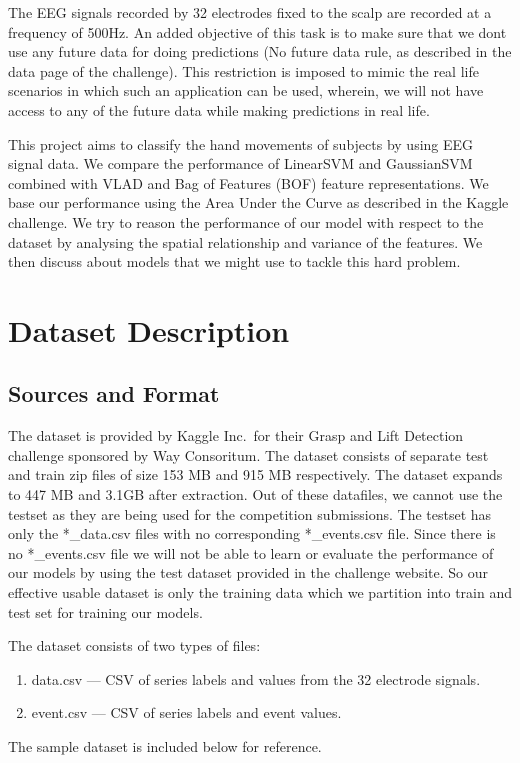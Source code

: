 \documentclass[final,leqno,onefignum,onetabnum]{siamltexmm}
\begin{document}
The EEG signals recorded by 32 electrodes fixed to the scalp are recorded at a frequency of 500Hz.  An added objective of this task is to make sure that we dont use any future data for doing predictions (No future data rule, as described in the data page of the challenge).  This restriction is imposed to mimic the real life scenarios in which such an application can be used, wherein, we will not have access to any of the future data while making predictions in real life.\cite{website:kaggle-competition}


This project aims to classify the hand movements of subjects by using EEG signal data.  We compare the performance of LinearSVM and GaussianSVM combined with VLAD and Bag of Features (BOF) feature representations.  We base our performance using the Area Under the Curve as described in the Kaggle challenge.  We try to reason the performance of our model with respect to the dataset by analysing the spatial relationship and variance of the features.  We then discuss about models that we might use to tackle this hard problem.

\section{Dataset Description}

\subsection{Sources and Format}
The dataset is provided by Kaggle Inc.\ for their Grasp and Lift Detection challenge\cite{website:kaggle-competition} sponsored by Way Consoritum\cite{website:way_consoritum}.  
The dataset consists of separate test and train zip files of size 153 MB and 915 MB respectively.  
The dataset expands to 447 MB and 3.1GB after extraction.  
Out of these datafiles, we cannot use the testset as they are being used for the competition submissions.  
The testset has only the *\_data.csv files with no corresponding *\_events.csv file.  
Since there is no *\_events.csv file we will not be able to learn or evaluate the performance of our models by using the test dataset provided in the challenge website.
So our effective usable dataset is only the training data which we partition into train and test set for training our models.

The dataset consists of two types of files: 
\begin{enumerate}
  \item{data.csv} --- CSV of series labels and values from the 32 electrode signals.
  \item{event.csv} --- CSV of series labels and event values.
\end{enumerate}
The sample dataset is included below for reference.
\end{document}

